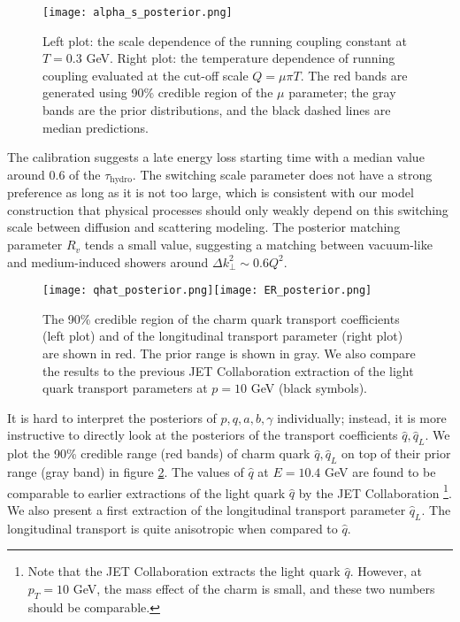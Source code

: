 \begin{figure}
\singlespacing
\centering
\texttt{[image: alpha\_s\_posterior.png]}
\caption[Left plot: the scale dependence of the running coupling constant at]{Left plot: the scale dependence of the running coupling constant at $T=0.3$ GeV. Right plot: the temperature dependence of running coupling evaluated at the cut-off scale $Q=\mu\pi T$. The red bands are generated using 90\% credible region of the $\mu$ parameter; the gray bands are the prior distributions, and the black dashed lines are median predictions.}
\label{fig:new:posterior-alphas}
\end{figure}

The calibration suggests a late energy loss starting time with a median value around 0.6 of the $\tau_{\textrm{hydro}}$.
The switching scale parameter does not have a strong preference as long as it is not too large, which is consistent with our model construction that physical processes should only weakly depend on this switching scale between diffusion and scattering modeling.
The posterior matching parameter $R_v$ tends a small value, suggesting a matching between vacuum-like and medium-induced showers around $\Delta k_\perp^2 \sim 0.6 Q^2$.

\begin{figure}
\singlespacing
\centering
\texttt{[image: qhat\_posterior.png]}\texttt{[image: ER\_posterior.png]}
\caption[The 90\% credible region of the charm quark transport coefficients]{The 90\% credible region of the charm quark transport coefficients (left plot) and of the longitudinal transport parameter (right plot) are shown in red. The prior range is shown in gray. We also compare the results to the previous JET Collaboration extraction of the light quark transport parameters at $p=10$ GeV (black symbols). }
\label{fig:new:posterior-qhat}
\end{figure}

It is hard to interpret the posteriors of $p, q, a, b, \gamma$ individually; instead, it is more instructive to directly look at the posteriors of the transport coefficients $\hat{q}, \hat{q}_L$.
We plot the 90\% credible range (red bands) of charm quark $\hat{q}, \hat{q}_L$ on top of their prior range (gray band) in figure \ref{fig:new:posterior-qhat}.
The values of $\hat{q}$ at $E=10.4$ GeV are found to be comparable to earlier extractions of the light quark $\hat{q}$ by the JET Collaboration \cite{Burke:2013yra} \footnote{\singlespacing  Note that the JET Collaboration extracts the light quark $\hat{q}$. However, at $p_T = 10$ GeV, the mass effect of the charm is small, and these two numbers should be comparable.}.
We also present a first extraction of the longitudinal transport parameter $\hat{q}_L$. 
The longitudinal transport is quite anisotropic when compared to $\hat{q}$.

